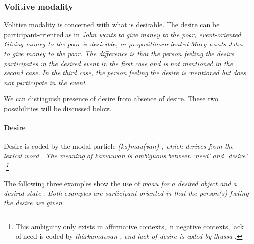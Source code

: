 
\subsubsection[Volitive]{Volitive modality}\label{sec:func:Volitivemodality}
Volitive modality is concerned with what is desirable. The desire can be participant-oriented as in \em John wants to give money to the poor\em, event-oriented \em Giving money to the poor is desirable\em, or proposition-oriented \em Mary wants John to give money to the poor. \em The difference is that the person feeling the desire participates in the desired event in the first case and is not mentioned in the second case. In the third case, the person feeling the desire is mentioned but does not participate in the event.

We can distinguish presence of desire from absence of desire. These two possibilities will be discussed below.

\paragraph{Desire}\label{sec:func:Desire}
Desire is coded by the modal particle \em (ka)mau(van) \em {}, which derives from the lexical word . The meaning of \em kamauvan \em is ambiguous between `need' and `desire' .\footnote{This ambiguity only exists in affirmative contexts, in negative contexts, lack of need is coded by \em thàrkamauvan \em {}, and lack of desire is coded by \em thussa \em {}.}


The following three examples show the use of \em maau \em for a desired object  and a desired state . Both examples are participant-oriented in that the person(s) feeling the desire are given.

